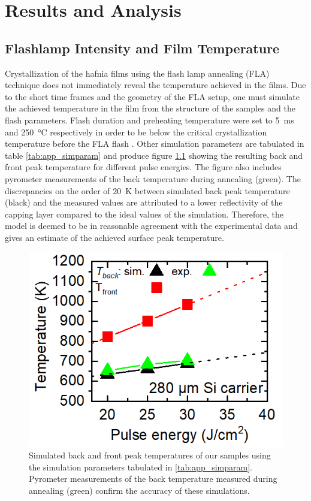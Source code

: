 \documentclass[11pt,twoside]{eitExjobb}
\begin{document}
\chapter{Results and Analysis}\label{ch:res}

\section{Flashlamp Intensity and Film Temperature}
Crystallization of the hafnia films using the flash lamp annealing (FLA)
technique does not immediately reveal the temperature achieved in the films. Due
to the short time frames and the geometry of the FLA setup, one must simulate
the achieved temperature in the film from the structure of the samples and the
flash parameters. Flash duration and preheating temperature were set to
\SI{5}{\milli\second} and \SI{250}{\celsius} respectively in order to be below
the critical crystallization temperature before the FLA
flash \cite{migita2019phase}. Other simulation parameters are tabulated in
table \ref{tab:app_simparam} and produce figure \ref{fig:res_Comsol} showing the
resulting back and front peak temperature for different pulse energies. The figure also
includes pyrometer measurements of the back temperature during annealing
(green). The discrepancies on the order of \SI{20}{\kelvin} between simulated
back peak temperature (black) and the measured values are attributed to a 
lower reflectivity of the  capping layer compared to the ideal values of
the simulation. Therefore, the model is deemed to be in reasonable agreement
with the experimental data and gives an estimate of the achieved surface peak temperature.

\begin{figure}[htbp]
    \centering
    \includegraphics[width=.41\linewidth]{fig/COMSOLFlashInt.png}
    \caption{Simulated back and front peak temperatures of our samples using the
    simulation parameters tabulated in \ref{tab:app_simparam}. Pyrometer
    measurements of the back temperature measured during annealing (green) confirm
    the accuracy of these simulations.}\label{fig:res_Comsol}
\end{figure}
\end{document}
